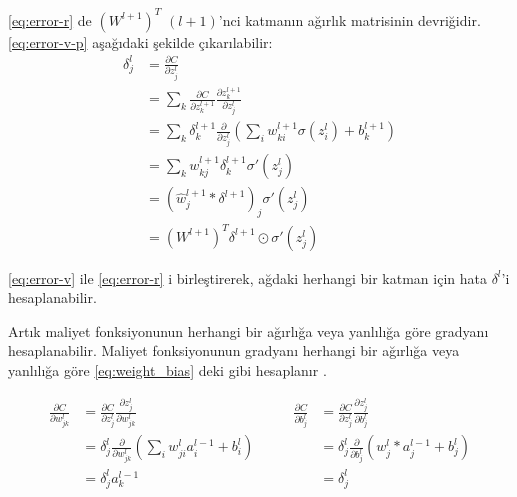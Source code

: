 \eqref{eq:error-r} de $(W^{l+1})^T$ $(l+1)$'nci katmanın ağırlık matrisinin devriğidir.
\eqref{eq:error-v-p} aşağıdaki şekilde çıkarılabilir:
\begin{equation}
    \begin{split}
        \delta^l_j &= \frac{\partial C}{\partial z^l_j} \\
                                &= \sum_k \frac{\partial C}{\partial z^{l+1}_k} \frac{\partial z^{l+1}_k}{\partial z^l_j} \\ 
                                &= \sum_k \delta^{l+1}_k \frac{\partial}{\partial z^l_j}  \left( \sum_i w^{l+1}_{ki} \sigma(z^l_i) +b^{l+1}_k \right) \\
                                &= \sum_k w^{l+1}_{kj}  \delta^{l+1}_k \sigma'(z^l_j) \\
                                &= \left( \hat{w}^{l+1}_j * \delta^{l+1} \right)_j \sigma'(z^l_j) \\
                                &=  (W^{l+1})^T \delta^{l+1} \odot \sigma'(z^l_j)
    \end{split}
    \label{eq:error-v-p}
\end{equation}

\eqref{eq:error-v} ile \eqref{eq:error-r} i birleştirerek, ağdaki herhangi bir katman için hata $\delta^l$'i hesaplanabilir.

Artık maliyet fonksiyonunun herhangi bir ağırlığa veya yanlılığa göre gradyanı hesaplanabilir. Maliyet fonksiyonunun gradyanı herhangi bir ağırlığa veya yanlılığa göre \eqref{eq:weight_bias} deki gibi hesaplanır \cite{nielsen2015neural}. 

\begin{equation}
    \label{eq:weight_bias}
    \begin{split}
        \frac{\partial C}{\partial w^l_{jk}} &= \frac{\partial C}{\partial z^l_j}\frac{\partial z^l_j}{\partial w^l_{jk}} \\ 
        &= \delta^l_j \frac{\partial}{\partial w^l_{jk}}\left( \sum_i w^l_{ji}a^{l-1}_i + b^l_i \right) \\ 
        &= \delta^l_j a^{l-1}_k
    \end{split}
    \qquad
    \begin{split}
        \frac{\partial C}{\partial b^l_j} &=  \frac{\partial C}{\partial z^l_j}\frac{\partial z^l_j}{\partial b^l_j} \\ 
        &= \delta^l_j \frac{\partial}{\partial b^l_j}\left( w^l_j * a^{l-1}_j + b^l_j \right) \\ 
        &= \delta^l_j
    \end{split}
\end{equation}



